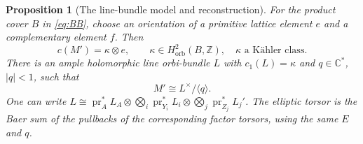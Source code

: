 \documentclass[12pt]{amsart}
\newtheorem{prop}[thm]{Proposition}
\theoremstyle{definition}
\theoremstyle{remark}
\numberwithin{equation}{section}
\DeclareMathOperator{\pr}{pr}
\newcommand{\orb}{\mathrm{orb}}
\newcommand{\Z}{\mathbb{Z}}
\newcommand{\C}{\mathbb{C}}
\begin{document}
\begin{prop}[The line-bundle model and reconstruction]\label{prop:reconstruct}
For the product cover $B$ in \eqref{eq:BB}, choose an orientation of a
primitive lattice element $e$ and a complementary element $f$. Then
\begin{equation}\label{eq:char}
c(M')=\kappa\otimes e,
\qquad \kappa\in H^2_{\orb}(B,\Z),\quad \kappa\text{ a K\"ahler class}.
\end{equation}
There is an ample holomorphic line orbi-bundle $L$ with $c_1(L)=\kappa$
and $q\in\C^*$, $|q|<1$, such that
\begin{equation}\label{eq:line}
M'\cong L^{\times}/\langle q\rangle.
\end{equation}
One can write
$L\cong\pr_A^*L_A\otimes\bigotimes_i\pr_{Y_i}^*L_i
\otimes\bigotimes_j\pr_{Z_j}^*L_j'$.
The elliptic torsor is the Baer sum of the pullbacks of the corresponding
factor torsors, using the same $E$ and $q$.
\end{prop}
\end{document}
